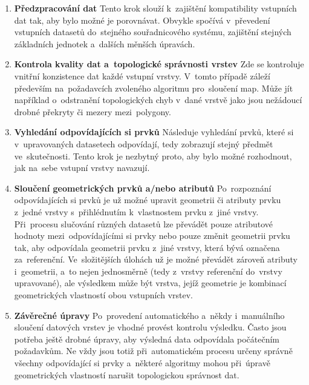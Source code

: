 \begin{enumerate}[leftmargin=*]
  \item \textbf{Předzpracování dat}
    \subitem Tento krok slouží k~zajištění kompatibility vstupních dat tak, 
      aby bylo možné je porovnávat. Obvykle spočívá v~převedení vstupních 
      datasetů do~stejného souřadnicového systému, zajištění stejných 
      základních jednotek a~dalších měnších úpravách. 
  \item \textbf{Kontrola kvality dat a~topologické správnosti vrstev}
    \subitem Zde se kontroluje vnitřní konzistence dat každé vstupní vrstvy.
      V~tomto případě záleží především na~požadavcích zvoleného algoritmu 
      pro~sloučení map. Může jít například o~odstranění topologických chyb 
      v~dané vrstvě jako jsou nežádoucí drobné překryty či mezery 
      mezi~polygony.
  \item \textbf{Vyhledání odpovídajících si prvků}
      \subitem Následuje vyhledání prvků, které si v~upravovaných datasetech
      odpovídají, tedy zobrazují stejný předmět ve~skutečnosti. Tento krok je 
      nezbytný proto, aby bylo možné rozhodnout, jak na~sebe vstupní vrstvy 
      navazují.
  \item \textbf{Sloučení geometrických prvků a/nebo atributů}
      \subitem Po~rozpoznání odpovídajících si prvků je už možné upravit 
      geometrii či atributy prvku z~jedné vrstvy s~přihlédnutím k~vlastnostem 
      prvku z~jiné vrstvy. Při~procesu slučování různých datasetů lze převádět 
      pouze atributové hodnoty mezi~odpovídajícími si prvky nebo pouze změnit 
      geometrii prvku tak, aby odpovídala geometrii prvku z~jiné vrstvy, která 
      bývá označena za~referenční. Ve~složitějších úlohách už je možné převádět
      zároveň atributy i~geometrii, a~to nejen jednosměrně (tedy z~vrstvy
      referenční do~vrstvy upravované), ale výsledkem může být vrstva, jejíž 
      geometrie je kombinací geometrických vlastností obou vstupních vrstev.
  \item \textbf{Závěrečné úpravy}
      \subitem Po~provedení automatického a~někdy i~manuálního sloučení datových
      vrstev je vhodné provést kontrolu výsledku. Často jsou potřeba ještě drobné
      úpravy, aby výsledná data odpovídala počátečním požadavkům. Ne vždy jsou 
      totiž při~automatickém procesu určeny správně všechny odpovídající si prvky
      a~některé algoritmy mohou při~úpravě geometrických vlastností narušit 
      topologickou správnost dat.
\end{enumerate}


